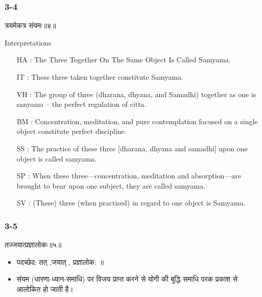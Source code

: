 \begin{frame}[fragile]\frametitle{3-4}
\begin{sanskrit}
त्रयमेकत्र संयमः॥४॥
\end{sanskrit}

Interpretations
\begin{itemize}	
\item [HA]: The Three Together On The Same Object Is Called Samyama.
\item [IT]: These three taken together constitute Samyama.
\item [VH]: The group of three (dharana, dhyana, and Samadhi) together as one is sanyama – the perfect regulation of citta.
\item [BM]: Concentration, meditation, and pure contemplation focused on a single object constitute perfect discipline.
\item [SS]: The practice of these three [dharana, dhyana and samadhi] upon one object is called samyama.
\item [SP]: When these three—concentration, meditation and absorption—are brought to bear upon one subject, they are called samyama.
\item [SV]: (These) three (when practised) in regard to one object is Samyama. 
\end{itemize}
\end{frame}

\begin{frame}[fragile]\frametitle{3-5}
\begin{sanskrit}
तज्जयात्प्रज्ञालोकः॥५॥
\end{sanskrit}

\begin{itemize}
\item पदच्छेद: तत् ,जयात् , प्रज्ञालोक: ॥
\item संयम (धारणा-ध्यान-समाधि) पर विजय प्राप्त करने से योगी की बुद्धि समाधि परक प्रकाश से आलोकित हो जाती है।
\end{itemize}
\end{frame}


